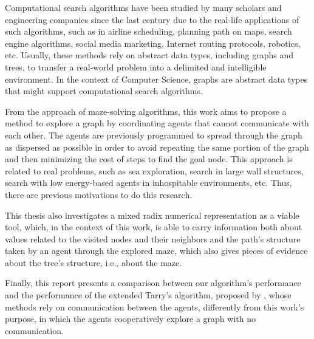 Computational search algorithms have been studied by many scholars and engineering companies since the last century due to the real-life applications of such algorithms, such as in airline scheduling, planning path on maps, search engine algorithms, social media marketing, Internet routing protocols, robotics, etc. Usually, these methods rely on abstract data types, including graphs and trees, to transfer a real-world problem into a delimited and intelligible environment. In the context of Computer Science, graphs are abstract data types that might support computational search algorithms.

From the approach of maze-solving algorithms, this work aims to propose a method to explore a graph by coordinating agents that cannot communicate with each other. The agents are previously programmed to spread through the graph as dispersed as possible in order to avoid repeating the same portion of the graph and then minimizing the cost of steps to find the goal node. This approach is related to real problems, such as sea exploration, search in large wall structures, search with low energy-based agents in inhospitable environments, etc. Thus, there are previous motivations to do this research.

This thesis also investigates a mixed radix numerical representation as a viable tool, which, in the context of this work, is able to carry information both about values related to the visited nodes and their neighbors and the path's structure taken by an agent through the explored maze, which also gives pieces of evidence about the tree's structure, i.e., about the maze.

Finally, this report presents a comparison between our algorithm's performance and the performance of the extended Tarry's algorithm, proposed by , whose methods rely on communication between the agents, differently from this work's purpose, in which the agents cooperatively explore a graph with no communication.
